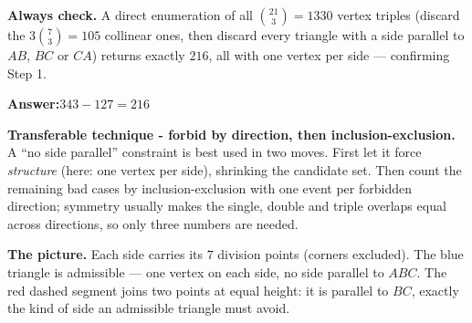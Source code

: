 \documentclass[11pt,a4paper]{article}
\newcommand{\answer}[1]{\begin{answerbox}\centering\textbf{Answer:}\quad #1\end{answerbox}}
\begin{document}
\textbf{Always check.} A direct enumeration of all $\binom{21}{3}=1330$ vertex triples (discard the
$3\binom{7}{3}=105$ collinear ones, then discard every triangle with a side parallel to $AB$, $BC$
or $CA$) returns exactly $216$, all with one vertex per side --- confirming Step 1.

\answer{$343-127=216$}

\begin{methodbox}
\textbf{Transferable technique - forbid by direction, then inclusion-exclusion.} A ``no side
parallel'' constraint is best used in two moves. First let it force \emph{structure} (here: one
vertex per side), shrinking the candidate set. Then count the remaining bad cases by
inclusion-exclusion with one event per forbidden direction; symmetry usually makes the single,
double and triple overlaps equal across directions, so only three numbers are needed.
\end{methodbox}

\medskip
\textbf{The picture.} Each side carries its $7$ division points (corners excluded). The blue
triangle is admissible --- one vertex on each side, no side parallel to $ABC$. The red dashed
segment joins two points at equal height: it is parallel to $BC$, exactly the kind of side an
admissible triangle must avoid.

\begin{center}
\end{center}
\end{document}

